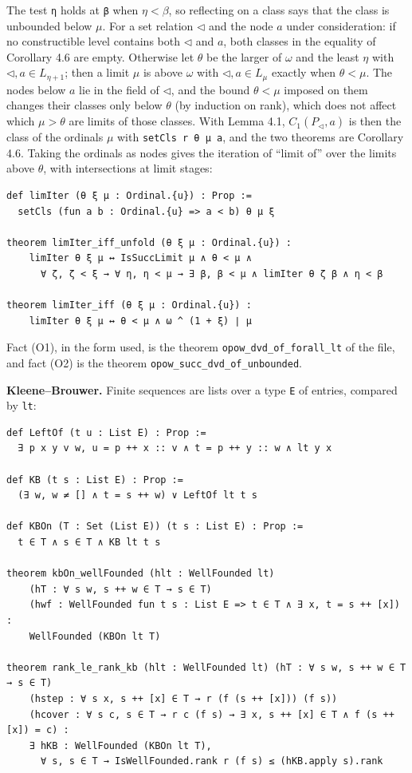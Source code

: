 \documentclass[11pt]{article}
\begin{document}
The test \texttt{η} holds at \texttt{β} when $\eta < \beta$, so reflecting on a class says that the class is
unbounded below $\mu$. For a set relation $\lhd$ and the node $a$ under consideration: if no constructible level
contains both $\lhd$ and $a$, both classes in the equality of Corollary 4.6 are empty. Otherwise let $\theta$ be the larger of
$\omega$ and the least $\eta$ with $\lhd, a \in L_{\eta+1}$; then a limit $\mu$ is above $\omega$ with $\lhd, a \in
L_\mu$ exactly when $\theta < \mu$. The nodes below $a$ lie in the field of $\lhd$, and the bound $\theta < \mu$
imposed on them changes their classes only below $\theta$ (by induction on rank), which does not affect which $\mu > \theta$ are limits of
those classes. With Lemma 4.1, $C_1(P_\lhd, a)$ is then the class of the ordinals $\mu$ with \texttt{setCls r θ μ a},
and the two theorems are Corollary 4.6. Taking the ordinals as nodes gives the iteration of ``limit of'' over the
limits above $\theta$, with intersections at limit stages:

\begin{verbatim}
def limIter (θ ξ μ : Ordinal.{u}) : Prop :=
  setCls (fun a b : Ordinal.{u} => a < b) θ μ ξ

theorem limIter_iff_unfold (θ ξ μ : Ordinal.{u}) :
    limIter θ ξ μ ↔ IsSuccLimit μ ∧ θ < μ ∧
      ∀ ζ, ζ < ξ → ∀ η, η < μ → ∃ β, β < μ ∧ limIter θ ζ β ∧ η < β

theorem limIter_iff (θ ξ μ : Ordinal.{u}) :
    limIter θ ξ μ ↔ θ < μ ∧ ω ^ (1 + ξ) ∣ μ
\end{verbatim}

Fact (O1), in the form used, is the theorem \texttt{opow\_dvd\_of\_forall\_lt} of the file, and fact (O2) is
the theorem \texttt{opow\_succ\_dvd\_of\_unbounded}.

\textbf{Kleene--Brouwer.} Finite sequences are lists over a type \texttt{E} of entries, compared by \texttt{lt}:

\begin{verbatim}
def LeftOf (t u : List E) : Prop :=
  ∃ p x y v w, u = p ++ x :: v ∧ t = p ++ y :: w ∧ lt y x

def KB (t s : List E) : Prop :=
  (∃ w, w ≠ [] ∧ t = s ++ w) ∨ LeftOf lt t s

def KBOn (T : Set (List E)) (t s : List E) : Prop :=
  t ∈ T ∧ s ∈ T ∧ KB lt t s

theorem kbOn_wellFounded (hlt : WellFounded lt)
    (hT : ∀ s w, s ++ w ∈ T → s ∈ T)
    (hwf : WellFounded fun t s : List E => t ∈ T ∧ ∃ x, t = s ++ [x]) :
    WellFounded (KBOn lt T)

theorem rank_le_rank_kb (hlt : WellFounded lt) (hT : ∀ s w, s ++ w ∈ T → s ∈ T)
    (hstep : ∀ s x, s ++ [x] ∈ T → r (f (s ++ [x])) (f s))
    (hcover : ∀ s c, s ∈ T → r c (f s) → ∃ x, s ++ [x] ∈ T ∧ f (s ++ [x]) = c) :
    ∃ hKB : WellFounded (KBOn lt T),
      ∀ s, s ∈ T → IsWellFounded.rank r (f s) ≤ (hKB.apply s).rank
\end{verbatim}
\end{document}
